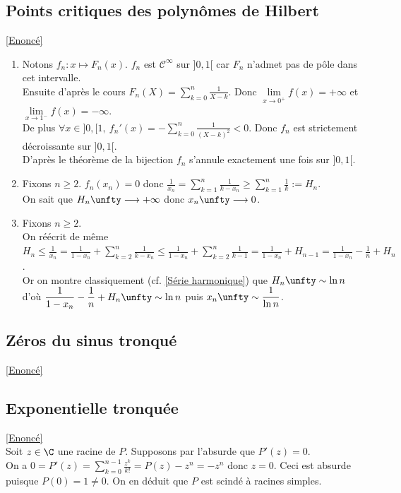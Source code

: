 \documentclass{book}
\begin{document}
	\subsection{Points critiques des polynômes de Hilbert }
	\label{sec:points-critiques-des-polynômes-de-hilbert}
	\textcolor{blue}{\hyperref[Points critiques des polynômes de Hilbert]{[Enoncé]}}\\
	\begin{enumerate}[leftmargin=*]
		\item Notons $f_n:x\mapsto F_n(x)$. $f_n$ est $\mathcal C^\infty$ sur $]0,1[$ car $F_n$ n'admet pas de pôle dans cet intervalle.\\
		Ensuite d'après le cours $F_n(X)=\displaystyle\sum_{k=0}^n\frac{1}{X-k}$. Donc $\lim\limits_{x\to 0^+}f(x)=+\infty$ et $\lim\limits_{x\to 1^-}f(x)=-\infty$.\\
		De plus $\forall x\in ]0,[1,\ f_n'(x)=-\displaystyle\sum_{k=0}^n\frac{1}{(X-k)^2}<0$. Donc $f_n$ est strictement décroissante sur $]0,1[$.\\
		D'après le théorème de la bijection $f_n$ s'annule exactement une fois sur $]0,1[$.
		\item Fixons $n\geq 2$. $f_n(x_n)=0$ donc $\displaystyle\frac{1}{x_n}=\sum_{k=1}^n\frac{1}{k-x_n}\geq \sum_{k=1}^n\frac{1}{k}:=H_n$.\\
		On sait que $H_n\unfty\longrightarrow+\infty$ donc $x_n\unfty\longrightarrow 0$.
		\item Fixons $n\geq 2$.\\
		On réécrit de même $\displaystyle H_n\leq\frac{1}{x_n}=\frac{1}{1-x_n}+\sum_{k=2}^n\frac{1}{k-x_n}\leq\frac{1}{1-x_n}+\sum_{k=2}^n\frac{1}{k-1}=\frac{1}{1-x_n}+H_{n-1}=\frac{1}{1-x_n}-\frac{1}{n}+H_n$.\\
		Or on montre classiquement (cf. \ref{Série harmonique}) que $H_n\unfty\sim\ln n$ d'où $\displaystyle\frac{1}{1-x_n}-\frac{1}{n}+H_n\unfty\sim\ln n$ puis $x_n\unfty\sim\dfrac{1}{\ln n}$.
	\end{enumerate}
	
	\subsection{Zéros du sinus tronqué}
	\label{sec:zeros-du-sinus-tronqué}
	\textcolor{blue}{\hyperref[Zéros du sinus tronqué]{[Enoncé]}}\\
	
	\subsection{Exponentielle tronquée }
	\label{sec:exponentielle-tronquée}
	\textcolor{blue}{\hyperref[Exponentielle tronquée]{[Enoncé]}}\\
	Soit $z\in \C$ une racine de $P$. Supposons par l'absurde que $P'(z)=0$.\\
	On a $0=P'(z)=\displaystyle\sum_{k=0}^{n-1}\frac{z^k}{k!}=P(z)-z^n=-z^n$ donc $z=0$. Ceci est absurde puisque $P(0)=1\ne 0$. On en déduit que $P$ est scindé à racines simples.
	
\end{document}
